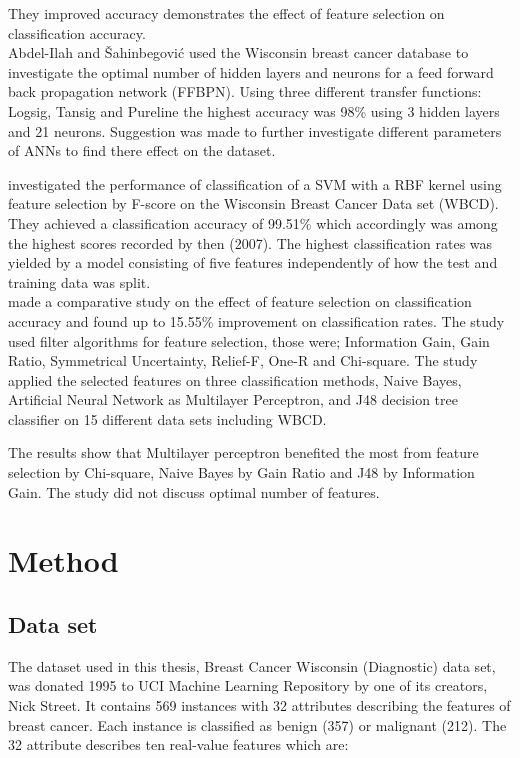 \documentclass{kththesis}
\begin{document}
They improved accuracy demonstrates the effect of feature selection on classification accuracy.\\

Abdel-Ilah and {\v{S}}ahinbegovi{\'{c}} \parencite{Abdel-Ilah2017} used the Wisconsin breast cancer database to investigate the optimal number of hidden layers and neurons for a feed forward back propagation network (FFBPN). Using three different transfer functions: Logsig, Tansig and Pureline the highest accuracy was 98\% using 3 hidden layers and 21 neurons. Suggestion was made to further investigate different parameters of ANNs to find there effect on the dataset.

\textcite{akay2009} investigated the performance of classification of a SVM with a RBF kernel using feature selection by F-score on the Wisconsin Breast Cancer Data set (WBCD). They achieved a classification accuracy of 99.51\% which accordingly was among the highest scores recorded by then (2007). The highest classification rates was yielded by a model consisting of five features independently of how the test and training data was split. \\

\textcite{karabulut2012} made a comparative study on the effect of feature selection on classification accuracy and found up to 15.55\% improvement on classification rates. The study used filter algorithms for feature selection, those were; Information Gain, Gain Ratio, Symmetrical Uncertainty, Relief-F, One-R and Chi-square. The study applied the selected features on three classification methods, Naive Bayes, Artificial Neural Network as Multilayer Perceptron, and J48 decision tree classifier on 15 different data sets including WBCD.

The results show that Multilayer perceptron benefited the most from feature selection by Chi-square, Naive Bayes by Gain Ratio and J48 by Information Gain. The study did not discuss optimal number of features.

\chapter{Method}

\section{Data set}

The dataset used in this thesis, Breast Cancer Wisconsin (Diagnostic) data set, was donated 1995 to UCI  Machine Learning Repository \parencite{dua:2017} by one of its creators, Nick Street. It contains 569 instances with 32 attributes describing the features of breast cancer. Each instance is classified as benign (357) or malignant (212). The 32 attribute describes ten real-value features which are:
\end{document}
